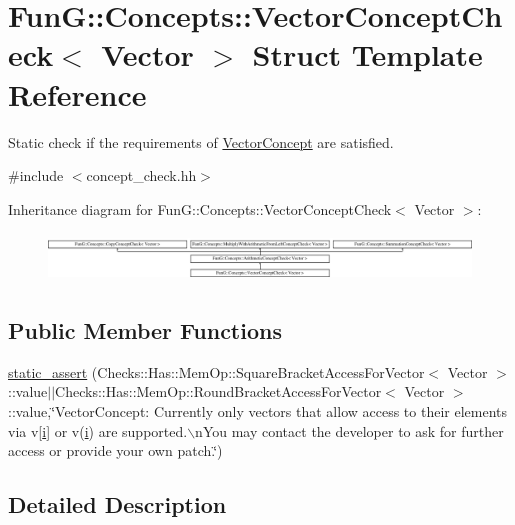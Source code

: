 \hypertarget{structFunG_1_1Concepts_1_1VectorConceptCheck}{\section{\-Fun\-G\-:\-:\-Concepts\-:\-:\-Vector\-Concept\-Check$<$ \-Vector $>$ \-Struct \-Template \-Reference}
\label{structFunG_1_1Concepts_1_1VectorConceptCheck}
}


\-Static check if the requirements of \hyperlink{structFunG_1_1Concepts_1_1VectorConcept}{\-Vector\-Concept} are satisfied.  




{\ttfamily \#include $<$concept\-\_\-check.\-hh$>$}

\-Inheritance diagram for \-Fun\-G\-:\-:\-Concepts\-:\-:\-Vector\-Concept\-Check$<$ \-Vector $>$\-:\begin{figure}[H]
\begin{center}
\leavevmode
\includegraphics[height=1.287356cm]{structFunG_1_1Concepts_1_1VectorConceptCheck}
\end{center}
\end{figure}
\subsection*{\-Public \-Member \-Functions}
\begin{DoxyCompactItemize}
\item 
\hyperlink{structFunG_1_1Concepts_1_1VectorConceptCheck_afab2df920c3a188be4f4286b699338c1}{static\-\_\-assert} (\-Checks\-::\-Has\-::\-Mem\-Op\-::\-Square\-Bracket\-Access\-For\-Vector$<$ \-Vector $>$\-::value$|$$|$\-Checks\-::\-Has\-::\-Mem\-Op\-::\-Round\-Bracket\-Access\-For\-Vector$<$ \-Vector $>$\-::value,\char`\"{}\-Vector\-Concept\-: \-Currently only vectors that allow access to their elements via v\mbox{[}\hyperlink{namespaceFunG_a596429cd53658fe4796a76dd39d6a8da}{i}\mbox{]} or v(\hyperlink{namespaceFunG_a596429cd53658fe4796a76dd39d6a8da}{i}) are supported.$\backslash$n\-You may contact the developer to ask for further access or provide your own patch.\char`\"{})
\end{DoxyCompactItemize}


\subsection{\-Detailed \-Description}
